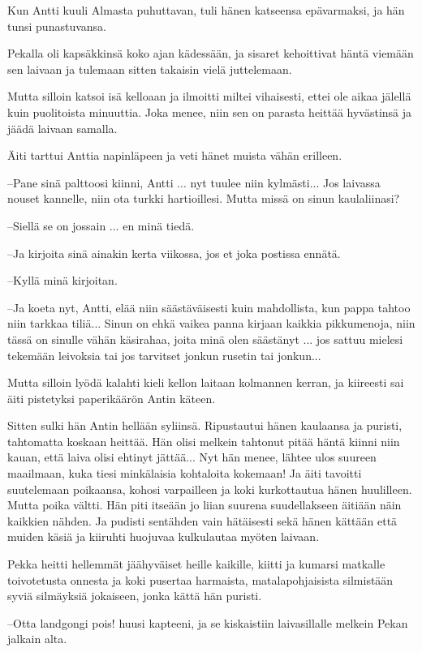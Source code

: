 \documentclass[a4paper,finnish,12pt]{scrartcl}
\begin{document}
Kun Antti kuuli Almasta puhuttavan, tuli hänen katseensa epävarmaksi,
ja hän tunsi punastuvansa.

Pekalla oli kapsäkkinsä koko ajan kädessään, ja sisaret kehoittivat
häntä viemään sen laivaan ja tulemaan sitten takaisin vielä
juttelemaan.

Mutta silloin katsoi isä kelloaan ja ilmoitti miltei vihaisesti, ettei
ole aikaa jälellä kuin puolitoista minuuttia. Joka menee, niin sen on
parasta heittää hyvästinsä ja jäädä laivaan samalla.

Äiti tarttui Anttia napinläpeen ja veti hänet muista vähän erilleen.

--Pane sinä palttoosi kiinni, Antti ... nyt tuulee niin kylmästi... Jos
laivassa nouset kannelle, niin ota turkki hartioillesi. Mutta missä on
sinun kaulaliinasi?

--Siellä se on jossain ... en minä tiedä.

--Ja kirjoita sinä ainakin kerta viikossa, jos et joka postissa ennätä.

--Kyllä minä kirjoitan.

--Ja koeta nyt, Antti, elää niin säästäväisesti kuin mahdollista, kun
pappa tahtoo niin tarkkaa tiliä... Sinun on ehkä vaikea panna kirjaan
kaikkia pikkumenoja, niin tässä on sinulle vähän käsirahaa, joita minä
olen säästänyt ... jos sattuu mielesi tekemään leivoksia tai jos
tarvitset jonkun rusetin tai jonkun...

Mutta silloin lyödä kalahti kieli kellon laitaan kolmannen kerran, ja
kiireesti sai äiti pistetyksi paperikäärön Antin käteen.

Sitten sulki hän Antin hellään syliinsä. Ripustautui hänen kaulaansa ja
puristi, tahtomatta koskaan heittää. Hän olisi melkein tahtonut pitää
häntä kiinni niin kauan, että laiva olisi ehtinyt jättää... Nyt hän
menee, lähtee ulos suureen maailmaan, kuka tiesi minkälaisia kohtaloita
kokemaan! Ja äiti tavoitti suutelemaan poikaansa, kohosi varpailleen ja
koki kurkottautua hänen huulilleen. Mutta poika vältti. Hän piti
itseään jo liian suurena suudellakseen äitiään näin kaikkien nähden. Ja
pudisti sentähden vain hätäisesti sekä hänen kättään että muiden käsiä
ja kiiruhti huojuvaa kulkulautaa myöten laivaan.

Pekka heitti hellemmät jäähyväiset heille kaikille, kiitti ja kumarsi
matkalle toivotetusta onnesta ja koki pusertaa harmaista,
matalapohjaisista silmistään syviä silmäyksiä jokaiseen, jonka kättä
hän puristi.

--Otta landgongi pois! huusi kapteeni, ja se kiskaistiin laivasillalle
melkein Pekan jalkain alta.
\end{document}
